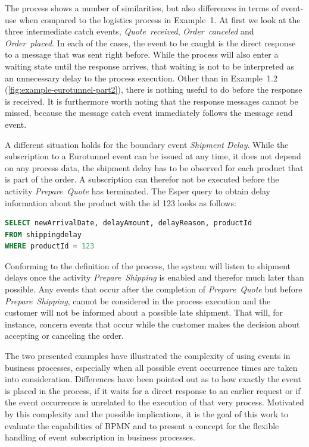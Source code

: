 The process shows a number of similarities, but also differences in terms of event-use when compared to the logistics process in Example~1.
At first we look at the three intermediate catch events, \textit{Quote~received}, \textit{Order~canceled} and \textit{Order~placed}.
In each of the cases, the event to be caught is the direct response to a message that was sent right before. While the process will also enter a waiting state until the response arrives, that waiting is not to be interpreted as an unnecessary delay to the process execution.
Other than in Example~1.2\,(\autoref{fig:example-eurotunnel-part2}), there is nothing useful to do before the response is received.
It is furthermore worth noting that the response messages cannot be missed, because the message catch event immediately follows the message send event.

A different situation holds for the boundary event \textit{Shipment Delay}.
While the subscription to a Eurotunnel event can be issued at any time, it does not depend on any process data, the shipment delay has to be observed for each product that is part of the order. A subscription can therefor not be executed before the activity \textit{Prepare~Quote} has terminated.
The Esper query to obtain delay information about the product with the id 123 looks as follows:

\begin{lstlisting}[language=sql,caption={Esper EPL Query to obtain delay information for a product},label=lst:epl-query-shipping-delay]
SELECT newArrivalDate, delayAmount, delayReason, productId
FROM shippingdelay
WHERE productId = 123
\end{lstlisting}

\noindent Conforming to the definition of the process, the system will listen to shipment delays once the activity \textit{Prepare~Shipping} is enabled and therefor much later than possible.
Any events that occur after the completion of \textit{Prepare~Quote} but before \textit{Prepare~Shipping}, cannot be considered in the process execution and the customer will not be informed about a possible late shipment. That will, for instance, concern events that occur while the customer makes the decision about accepting or canceling the order.


\medskip \noindent 
The two presented examples have illustrated the complexity of using events in business processes, especially when all possible event occurrence times are taken into consideration.
Differences have been pointed out as to how exactly the event is placed in the process, if it waits for a direct response to an earlier request or if the event occurrence is unrelated to the execution of that very process.
Motivated by this complexity and the possible implications, it is the goal of this work to evaluate the capabilities of BPMN and to present a concept for the flexible handling of event subscription in business processes.


